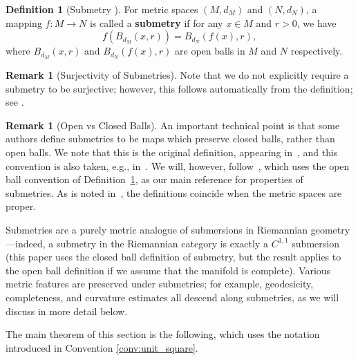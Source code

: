 \documentclass{article}
\theoremstyle{definition}
\newtheorem{definition}[proposition]{Definition}
\newtheorem{remark}[proposition]{Remark}
\begin{document}
\begin{definition}[Submetry \cite{berestovskii1987submetries}]\label{def:submetry}
    For metric spaces $(M, d_M)$ and $(N, d_N)$, a mapping $f: M \to N$ is called a \textbf{submetry} if for any $x\in M$ and $r > 0$, we have
    \begin{equation}
        f(B_{d_M}(x, r)) = B_{d_N}(f(x), r),
    \end{equation}
    where $B_{d_M}(x, r)$ and $B_{d_N}(f(x), r)$ are open balls in $M$ and $N$ respectively.
\end{definition}
\begin{remark}[Surjectivity of Submetries]
Note that we do not explicitly require a submetry to be surjective; however, this follows automatically from the definition; see \cite[Proposition 3.3]{alexander2024alexandrov}.

%
%
%
%
%
%
\end{remark}

\begin{remark}[Open vs Closed Balls]
    An important technical point is that some authors define submetries to be maps which preserve closed balls, rather than open balls. We note that this is the original definition, appearing in~\cite{berestovskii1987submetries}, and this convention is also taken, e.g., in~\cite{berestovskii2000metric}. We will, however, follow~\cite{alexander2024alexandrov}, which uses the open ball convention of Definition~\ref{def:submetry}, as our main reference for properties of submetries. As is noted in~\cite{kapovitch2022structure}, the definitions coincide when the metric spaces are proper.
\end{remark}

Submetries are a purely metric analogue of submersions in Riemannian geometry---indeed, a submetry in the Riemannian category is exactly a $C^{1,1}$ submersion~\cite{berestovskii2000metric} (this paper uses the  closed ball definition of submetry, but the result applies to the open ball definition if we assume that the manifold is complete). Various metric features are preserved under submetries; for example, geodesicity, completeness, and curvature estimates all descend along submetries, as we will discuss in more detail below. 


The main theorem of this section is the following, which uses the notation introduced in Convention \ref{conv:unit_square}.
\end{document}
